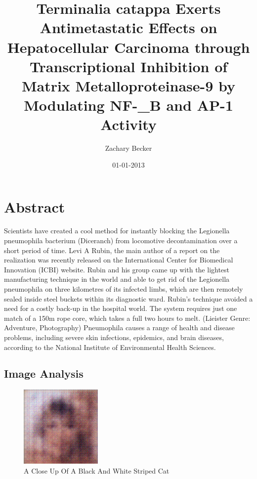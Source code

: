 \documentclass{article}%
\title{Terminalia catappa Exerts Antimetastatic Effects on Hepatocellular Carcinoma through Transcriptional Inhibition of Matrix Metalloproteinase{-}9 by Modulating NF{-}\_B and AP{-}1 Activity}%
\author{Zachary Becker}%
\affil{Department of Biochemistry, Osmania University, Hyderabad, A.P., India}%
\date{01{-}01{-}2013}%
\begin{document}
%
\normalsize%
\maketitle%
\section{Abstract}%
\label{sec:Abstract}%
Scientists have created a cool method for instantly blocking the Legionella pneumophila bacterium (Diceranch) from locomotive decontamination over a short period of time.\newline%
Levi A Rubin, the main author of a report on the realization was recently released on the International Center for Biomedical Innovation (ICBI) website. Rubin and his group came up with the lightest manufacturing technique in the world and able to get rid of the Legionella pneumophila on three kilometres of its infected limbs, which are then remotely sealed inside steel buckets within its diagnostic ward.\newline%
Rubin's technique avoided a need for a costly back{-}up in the hospital world.\newline%
The system requires just one match of a 150m rope core, which takes a full two hours to melt.\newline%
(Lieister Genre: Adventure, Photography)\newline%
Pneumophila causes a range of health and disease problems, including severe skin infections, epidemics, and brain diseases, according to the National Institute of Environmental Health Sciences.

%
\subsection{Image Analysis}%
\label{subsec:ImageAnalysis}%


\begin{figure}[h!]%
\centering%
\includegraphics[width=150px]{500_fake_images/samples_5_167.png}%
\caption{A Close Up Of A Black And White Striped Cat}%
\end{figure}

%
\end{document}
